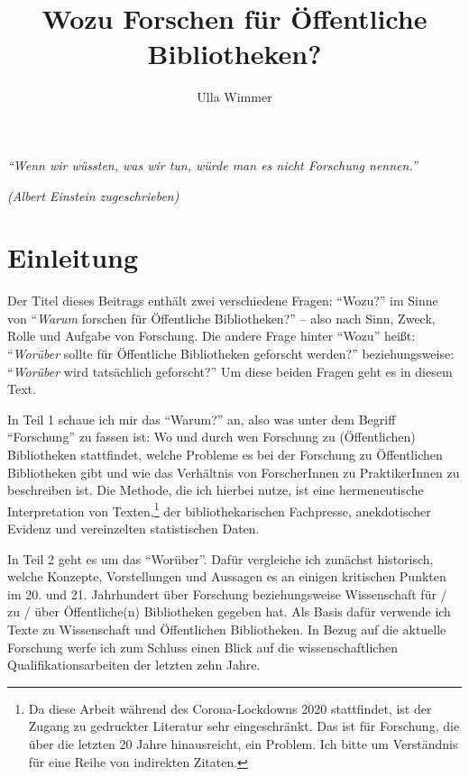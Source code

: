 \documentclass[a4paper,
fontsize=11pt,
oneside,
numbers=noperiodatend,
parskip=half-,
bibliography=totoc,
final
]{scrartcl}
\title{\LARGE{Wozu Forschen für Öffentliche Bibliotheken?}}%
\author{Ulla Wimmer} %
\date{}
\begin{document}
\maketitle
\thispagestyle{fancyplain} 


\emph{\enquote{Wenn wir wüssten, was wir tun, würde man es nicht
Forschung nennen.}}

\emph{(Albert Einstein zugeschrieben)}

\hypertarget{einleitung}{%
\section{Einleitung}\label{einleitung}}

Der Titel dieses Beitrags enthält zwei verschiedene Fragen:
\enquote{Wozu?} im Sinne von \enquote{\emph{Warum} forschen für
Öffentliche Bibliotheken?} -- also nach Sinn, Zweck, Rolle und Aufgabe
von Forschung. Die andere Frage hinter \enquote{Wozu} heißt:
\enquote{\emph{Worüber} sollte für Öffentliche Bibliotheken geforscht
werden?} beziehungsweise: \enquote{\emph{Worüber} wird tatsächlich
geforscht?} Um diese beiden Fragen geht es in diesem Text.

In Teil 1 schaue ich mir das \enquote{Warum?} an, also was unter dem
Begriff \enquote{Forschung} zu fassen ist: Wo und durch wen Forschung zu
(Öffentlichen) Bibliotheken stattfindet, welche Probleme es bei der
Forschung zu Öffentlichen Bibliotheken gibt und wie das Verhältnis von
ForscherInnen zu PraktikerInnen zu beschreiben ist. Die Methode, die ich
hierbei nutze, ist eine hermeneutische Interpretation von
Texten,\footnote{Da diese Arbeit während des Corona-Lockdowns 2020
  stattfindet, ist der Zugang zu gedruckter Literatur sehr
  eingeschränkt. Das ist für Forschung, die über die letzten 20 Jahre
  hinausreicht, ein Problem. Ich bitte um Verständnis für eine Reihe von
  indirekten Zitaten.} der bibliothekarischen Fachpresse, anekdotischer
Evidenz und vereinzelten statistischen Daten.

In Teil 2 geht es um das \enquote{Worüber}. Dafür vergleiche ich
zunächst historisch, welche Konzepte, Vorstellungen und Aussagen es an
einigen kritischen Punkten im 20. und 21. Jahrhundert über Forschung
beziehungsweise Wissenschaft für / zu / über Öffentliche(n) Bibliotheken
gegeben hat. Als Basis dafür verwende ich Texte zu Wissenschaft und
Öffentlichen Bibliotheken. In Bezug auf die aktuelle Forschung werfe ich
zum Schluss einen Blick auf die wissenschaftlichen
Qualifikationsarbeiten der letzten zehn Jahre.
\end{document}
